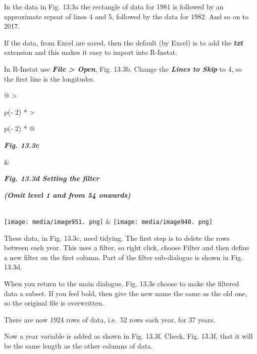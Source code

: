 \documentclass[
  letterpaper,
  DIV=11,
  numbers=noendperiod]{scrreprt}
\begin{document}
In the data in Fig. 13.3a the rectangle of data for 1981 is followed by
an approximate repeat of lines 4 and 5, followed by the data for 1982.
And so on to 2017.

If the data, from Excel are saved, then the default (by Excel) is to add
the \textbf{\emph{txt}} extension and this makes it easy to import into
R-Instat.

In R-Instat use \textbf{\emph{File \textgreater{} Open}}, Fig. 13.3b.
Change the \textbf{\emph{Lines to Skip}} to 4, so the first line is the
longitudes.

\begin{longtable}[]{@{}
  >{\raggedright\arraybackslash}p{(\columnwidth - 2\tabcolsep) * }
  >{\raggedright\arraybackslash}p{(\columnwidth - 2\tabcolsep) * }@{}}
\toprule\noalign{}
\begin{minipage}[b]{\linewidth}\raggedright
\textbf{\emph{Fig. 13.3c}}
\end{minipage} & \begin{minipage}[b]{\linewidth}\raggedright
\textbf{\emph{Fig. 13.3d Setting the filter}}

\textbf{\emph{(Omit level 1 and from 54 onwards)}}
\end{minipage} \\
\midrule\noalign{}
\endhead
\bottomrule\noalign{}
\endlastfoot
\texttt{[image: media/image951. png]}
&
\texttt{[image: media/image940. png]} \\
\end{longtable}

These data, in Fig. 13.3c, need tidying. The first step is to delete the
rows between each year. This uses a filter, so right click, choose
Filter and then define a new filter on the first column. Part of the
filter sub-dialogue is shown in Fig. 13.3d.

When you return to the main dialogue, Fig. 13.3e choose to make the
filtered data a subset. If you feel bold, then give the new name the
same as the old one, so the original file is overwritten.

There are now 1924 rows of data, i.e.~52 rows each year, for 37 years.

Now a year variable is added as shown in Fig. 13.3f. Check, Fig. 13.3f,
that it will be the same length as the other columns of data.
\end{document}

